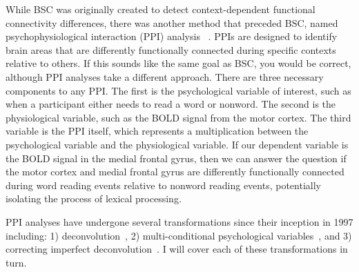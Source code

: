 \documentclass[phd,appendix,figures]{uithesis}
\begin{document}
While BSC was originally created to detect context-dependent functional connectivity
differences, there was another method
that preceded BSC, named psychophysiological interaction (PPI) analysis ~\cite{Friston1997}. 
PPIs are designed to identify brain areas that are differently functionally connected
during specific contexts relative to others.
If this sounds like the same goal as BSC, you would be correct, although PPI
analyses take a different approach.
There are three necessary components to any PPI.
The first is the psychological variable of interest, such as when a participant
either needs to read a word or nonword.
The second is the physiological variable, such as the BOLD signal from
the motor cortex.
The third variable is the PPI itself, which represents a multiplication
between the psychological variable and the physiological variable.
If our dependent variable is the BOLD signal in the medial frontal gyrus,
then we can answer the question if the motor cortex and medial frontal gyrus
are differently functionally connected during word reading events relative
to nonword reading events, potentially isolating the process of
lexical processing.

PPI analyses have undergone several transformations since their inception in 1997 including:
1) deconvolution~\cite{Gitelman2003}, 2) multi-conditional psychological variables~\cite{McLaren2012},
and 3) correcting imperfect deconvolution~\cite{Di2017}.
I will cover each of these transformations in turn.
\end{document}
